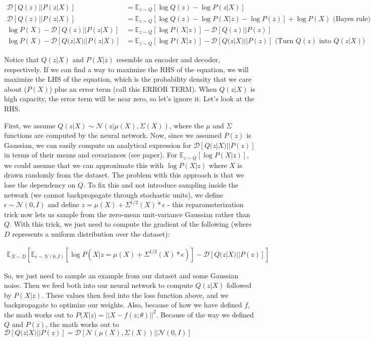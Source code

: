 \documentclass[a4paper]{article}
\begin{document}
\begin{align}
  \mathcal{D}[Q(z) || P(z | X)] &= \mathbb{E}_{z \sim Q}[\log{Q(z)} -
  \log{P(z|X)}] \\
  \mathcal{D}[Q(z) || P(z | X)] &= \mathbb{E}_{z \sim Q}[\log{Q(z)} -
  \log{P(X|z)} - \log{P(z)}] + \log{P(X)} \text{ (Bayes rule)} \\
  \log{P(X)} - \mathcal{D}[Q(z) || P(z|X)] &= \mathbb{E}_{z \sim Q}[
  \log{P(X|z)}] - \mathcal{D}[{Q(z) || P(z)}] \\
  \log{P(X)} - \mathcal{D}[Q(z|X) || P(z|X)] &= \mathbb{E}_{z \sim Q}[
  \log{P(X|z)}] - \mathcal{D}[{Q(z|X) || P(z)}]
  \text{ (Turn $Q(z)$ into $Q(z|X)$)}
\end{align}

Notice that $Q(z|X)$ and $P(X|z)$ resemble an encoder and decoder,
respectively. If we can find a way to maximize the RHS of the equation,
we will maximize the LHS of the equation, which is the probability density
that we care about ($P(X)$) plus an error term (call this ERROR TERM).
When $Q(z|X)$ is high capacity,
the error term will be near zero, so let's ignore it. Let's look at the RHS.

First, we assume $Q(z|X) \sim \mathcal{N}(z|\mu(X), \Sigma(X))$,
where the $\mu$ and $\Sigma$ functions are computed by the neural network.
Now, since we assumed $P(z)$ is Gaussian, we can easily compute an analytical
expression for $\mathcal{D}[Q(z|X) || P(z)]$ in terms of their means and
covariances (see paper). For $\mathbb{E}_{z \sim Q}[\log{P(X|z)}]$, we could
assume that we can approximate this with $\log{P(X|z)}$ where $X$ is drawn
randomly from
the dataset. The problem with this approach is that we lose the dependency
on $Q$. To fix this and not introduce sampling inside the network (we cannot
backpropagate through stochastic units), we define
$\epsilon \sim \mathcal{N}(0, I)$ and define
$z = \mu(X) + \Sigma^{1/2}(X) * \epsilon$ - this reparameterization trick now
lets us sample from the zero-mean unit-variance Gaussian rather than $Q$. With
this trick, we just need to compute the gradient of the following (where $D$
represents a uniform distribution over the dataset):

\begin{align}
  \mathbb{E}_{X \sim D}[
    \mathbb{E}_{\epsilon \sim \mathcal{N}(0, I)}[
      \log{P(X|z = \mu(X) + \Sigma^{1/2}(X) * \epsilon)}
    ] - \mathcal{D}[Q(z|X) || P(z)]
  ]
\end{align}

So, we just need to sample an example from our dataset and some Gaussian noise.
Then we feed both into our neural network to compute $Q(z|X)$ followed by
$P(X|z)$. These values then feed into the loss function above, and we
backpropagate to optimize our weights. Also,
because of how we have defined $f$, the math works out to
$P(X|z) =||X - f(z; \theta)||^2$. Because of the way we defined $Q$ and $P(z)$,
the math works out to $\mathcal{D}[Q(z|X) || P(z)] = \mathcal{D}[
\mathcal{N}(\mu(X), \Sigma(X)) || \mathcal{N}(0, I)]$
\end{document}
